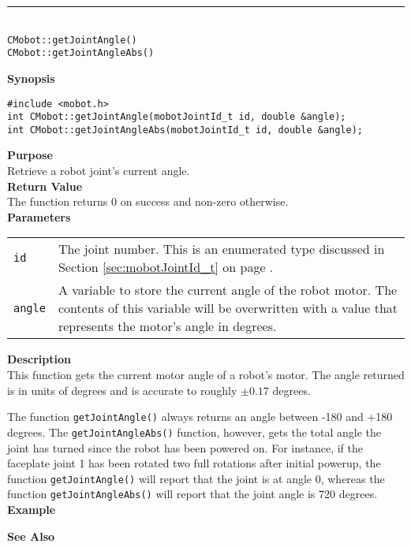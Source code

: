 \noindent
\vspace{5pt}
\rule{4.5in}{0.015in}\\
\noindent
{\LARGE \texttt{CMobot::getJointAngle()}}\\
{\LARGE \texttt{CMobot::getJointAngleAbs()}}\\
{}

\noindent
{\bf Synopsis}
\vspace{-8pt}
\begin{verbatim}
#include <mobot.h>
int CMobot::getJointAngle(mobotJointId_t id, double &angle);
int CMobot::getJointAngleAbs(mobotJointId_t id, double &angle);
\end{verbatim}

\noindent
{\bf Purpose}\\
Retrieve a robot joint's current angle.\\

\noindent
{\bf Return Value}\\
The function returns 0 on success and non-zero otherwise.\\

\noindent
{\bf Parameters}\\
\vspace{-0.1in}
\begin{description}
\item               
\begin{tabular}{p{15 mm}p{145 mm}}
\texttt{id} & The joint number. This is an enumerated type 
discussed in Section \ref{sec:mobotJointId_t} on page
\pageref{sec:mobotJointId_t}.\\
\texttt{angle} & A variable to store the current angle of the robot
motor. The contents of this variable will be overwritten with a value that
represents the motor's angle in degrees.  \\
\end{tabular}
\end{description}

\noindent
{\bf Description}\\
This function gets the current motor angle of a robot's motor. The
angle returned is in units of degrees and is accurate to roughly $\pm0.17$
degrees. 

The function \texttt{getJointAngle()} always returns an angle between -180 and
+180 degrees. The \texttt{getJointAngleAbs()} function, however, gets the total
angle the joint has turned since the robot has been powered on. For instance, 
if the faceplate joint 1 has been rotated two full rotations after initial powerup,
  the function \texttt{getJointAngle()} will report that the joint is at angle 0,
  whereas the function \texttt{getJointAngleAbs()} will report that the joint
  angle is 720 degrees.
\\

\noindent
{\bf Example}\\
\noindent

\noindent
{\bf See Also}\\

